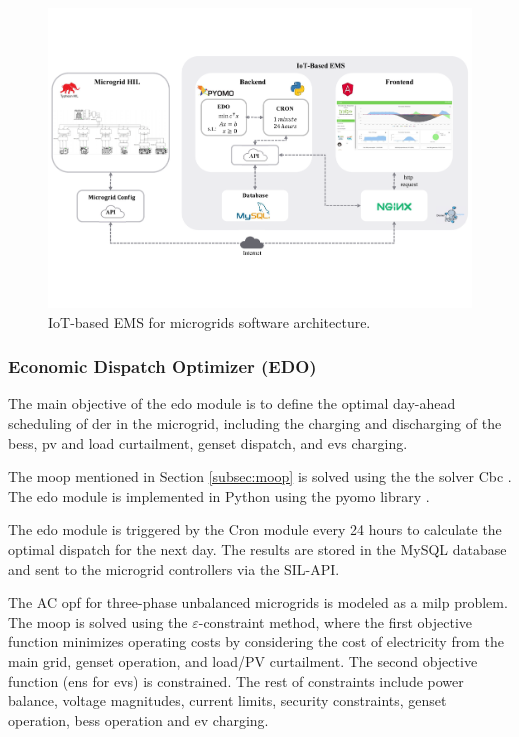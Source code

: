 \documentclass[preprint, 10pt, 5p]{elsarticle}
\begin{document}
\begin{figure}[!ht]
    \centering
    \includegraphics[width=\textwidth]{Figures/ems_architecture.pdf}
    \caption{IoT-based EMS for microgrids software architecture.}
    \label{fig:EMS_Architecture}
\end{figure}

\subsubsection{Economic Dispatch Optimizer (EDO)}

The main objective of the \gls{edo} module is to 
define the optimal day-ahead scheduling of \gls{der} in the microgrid, 
including the charging and discharging of the \gls{bess}, \gls{pv}
and load curtailment, \gls{genset} dispatch, and \glspl{ev} charging.

The \gls{moop} mentioned in Section \ref{subsec:moop} is solved using the
the solver Cbc \cite{cbc}. The \gls{edo} module is implemented in 
Python using the \gls{pyomo} library \cite{bookpyomo, artpyomo}.

The \gls{edo} module is triggered by the Cron module every 24 hours to
calculate the optimal dispatch for the next day. The results are stored in the
MySQL database and sent to the microgrid controllers via the SIL-API.

The AC \gls{opf} for three-phase unbalanced microgrids is 
modeled as a \gls{milp} problem. The \gls{moop} is solved using the
$\varepsilon$-constraint method, where the first objective function minimizes 
operating costs by considering the cost of electricity from the main grid, 
genset operation, and load/PV curtailment. The second objective function 
(\gls{ens} for \glspl{ev}) is constrained. 
The rest of constraints include power balance, voltage magnitudes, 
current limits, security constraints, genset operation, \gls{bess}
operation and \gls{ev} charging.
\end{document}
